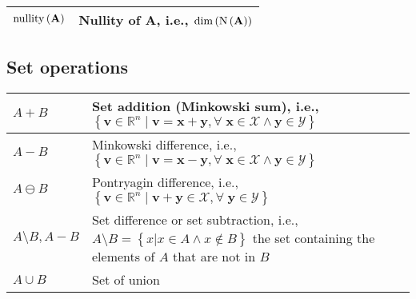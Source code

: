 \documentclass{article}
\begin{document}
\begin{xltabular}{\textwidth}{XX}
	\(\operatorname{nullity}\left(\mathbf{A}\right)\)                                                                                                                           & Nullity of \(\mathbf{A}\), i.e., \(\operatorname{dim}\left(\operatorname{N}\left(\mathbf{A}\right)\right)\)                                                                                                                                                                                             \\ \hline
\end{xltabular}

\subsection{Set operations}
\begin{xltabular}{\textwidth}{XX}
	\(A + B\)                           & Set addition (Minkowski sum), i.e., \(\left\{ \mathbf{v} \in \mathbb{R}^{n} \mid \mathbf{v} = \mathbf{x}+\mathbf{y}, \forall \; \mathbf{x} \in \mathcal{X} \wedge \mathbf{y} \in \mathcal{Y} \right\}\) \cite{kouvaritakisModelPredictiveControl2016}                                                                                             \\ \hline
	\(A - B\)                           & Minkowski difference, i.e., \(\left\{ \mathbf{v} \in \mathbb{R}^{n} \mid \mathbf{v} = \mathbf{x}-\mathbf{y}, \forall \; \mathbf{x} \in \mathcal{X} \wedge \mathbf{y} \in \mathcal{Y} \right\}\)                                                                                                                                                   \\ \hline
	\(A \ominus B\)                     & Pontryagin difference, i.e., \(\left\{ \mathbf{v} \in \mathbb{R}^{n} \mid \mathbf{v} + \mathbf{y} \in \mathcal{X} , \forall \; \mathbf{y} \in \mathcal{Y} \right\}\) \cite{kouvaritakisModelPredictiveControl2016}                                                                                                                                \\ \hline
	\(A \setminus B, A-B\)              & Set difference or set subtraction, i.e., \(A \setminus B = \left\{ x \vert x \in A \wedge x \not\in B \right\}\) the set containing the elements of \(A\) that are not in \(B\) \cite{rosenDiscreteMathematicsIts2011}                                                                                                                            \\ \hline
	\(A \cup B\)                        & Set of union                                                                                                                                                                                                                                                                                                                                      \\ \hline

\end{xltabular}
\end{document}
